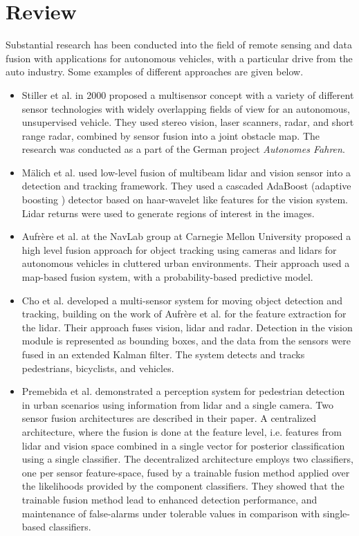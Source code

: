 \section{Review}
Substantial research has been conducted into the field of remote sensing and data fusion with applications for autonomous vehicles, with a particular drive from the auto industry. Some examples of different approaches are given below.
\begin{itemize}
	\item Stiller et al. \cite{STILLER2000389} in 2000 proposed a multisensor concept with a variety of different sensor technologies with widely overlapping fields of view for an autonomous, unsupervised vehicle. They used stereo vision, laser scanners, radar, and short range radar, combined by sensor fusion into a joint obstacle map. The research was conducted as a part of the German project \textit{Autonomes Fahren}.
	
	\item Mälich et al. \cite{sensorfusion_spatio_temporal} used low-level fusion of multibeam lidar and vision sensor into a detection and tracking framework. They used a cascaded AdaBoost (adaptive boosting \cite{machine_learning}) detector based on haar-wavelet like features \cite{CValg} for the vision system. Lidar returns were used to generate regions of interest in the images.
	
	\item Aufrère et al. \cite{Aufrere} at the NavLab group at Carnegie Mellon University proposed a high level fusion approach for object tracking using cameras and lidars for autonomous vehicles in cluttered urban environments. Their approach used a map-based fusion system, with a probability-based predictive model.
	
	\item Cho et al. \cite{Cho_multisensor_fusion} developed a multi-sensor system for moving object detection and tracking, building on the work of Aufrère et al. for the feature extraction for the lidar. Their approach fuses vision, lidar and radar. Detection in the vision module is represented as bounding boxes, and the data from the sensors were fused in an extended Kalman filter. The system detects and tracks pedestrians, bicyclists, and vehicles.
	
	\item Premebida et al. \cite{ROB:ROB20312} demonstrated a perception system for pedestrian detection in urban scenarios using information from lidar and a single camera. Two sensor fusion architectures are described in their paper. A  centralized architecture, where the fusion is done at the feature level, i.e. features from lidar and vision space combined in a single vector for posterior classification using a single classifier. The decentralized architecture employs two classifiers, one per sensor feature-space, fused by a trainable fusion method applied over the likelihoods provided by the component classifiers. They showed that the trainable fusion method lead to enhanced detection performance, and maintenance of false-alarms under tolerable values in comparison with single-based classifiers.
	

\end{itemize}
